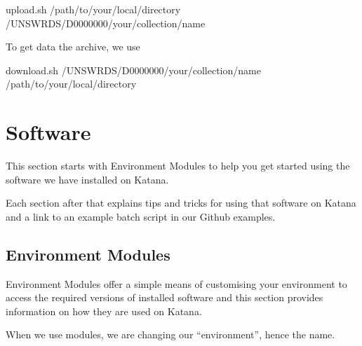 \documentclass[letterpaper,10pt,english]{sphinxmanual}
\begin{document}
\begin{sphinxVerbatim}[commandchars=\\\{\}]
upload.sh /path/to/your/local/directory /UNSW\PYGZus{}RDS/D0000000/your/collection/name
\end{sphinxVerbatim}

To get data  the archive, we use 

\begin{sphinxVerbatim}[commandchars=\\\{\}]
download.sh /UNSW\PYGZus{}RDS/D0000000/your/collection/name /path/to/your/local/directory
\end{sphinxVerbatim}


\chapter{Software}
\label{\detokenize{software/index:software}}\label{\detokenize{software/index:id1}}\label{\detokenize{software/index::doc}}
This section starts with Environment Modules to help you get started using the software we have installed on Katana.

Each section after that explains tips and tricks for using that software on Katana and a link to an example batch script in our Github examples.


\section{Environment Modules}
\label{\detokenize{software/environment_modules:environment-modules}}\label{\detokenize{software/environment_modules::doc}}
Environment Modules offer a simple means of customising your environment to access the required versions of installed software and this section provides information on how they are used on Katana.

When we use modules, we are changing our “environment”, hence the name.
\end{document}
